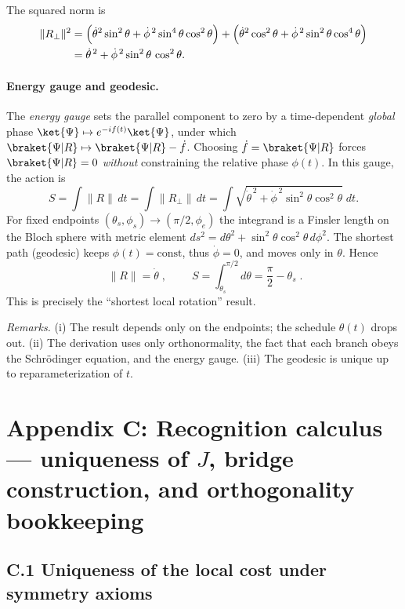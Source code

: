 \documentclass[11pt,letterpaper]{article}
\theoremstyle{definition}
\begin{document}
The squared norm is
\begin{align}
\|R_\perp\|^2
&=\Bigl(\dot\theta^2\sin^2\theta+\dot\phi^{\,2}\sin^4\theta\cos^2\theta\Bigr)
 + \Bigl(\dot\theta^2\cos^2\theta+\dot\phi^{\,2}\sin^2\theta\cos^4\theta\Bigr)\nonumber\\
&=\dot\theta^{\,2}+\dot\phi^{\,2}\sin^2\theta\,\cos^2\theta.
\label{eq:A-Rperp-norm}
\end{align}

\paragraph{Energy gauge and geodesic.}
The \emph{energy gauge} sets the parallel component to zero by a time-dependent \emph{global} phase $\ket{\Psi}\mapsto e^{-if(t)}\ket{\Psi}$, under which $\braket{\Psi|R}\mapsto \braket{\Psi|R}-\dot f$. Choosing $\dot f=\braket{\Psi|R}$ forces $\braket{\Psi|R}=0$ \emph{without} constraining the relative phase $\phi(t)$. In this gauge, the action is
\begin{equation}
S=\int\!\|R\|\,dt=\int\!\|R_\perp\|\,dt=\int\!\sqrt{\dot\theta^{\,2}+\dot\phi^{\,2}\sin^2\theta\cos^2\theta}\;dt.
\label{eq:A-S-energy-gauge}
\end{equation}
For fixed endpoints $(\theta_s,\phi_s)\to(\pi/2,\phi_e)$ the integrand is a Finsler length on the Bloch sphere with metric element $ds^2=d\theta^2+\sin^2\theta\cos^2\theta\,d\phi^2$. The shortest path (geodesic) keeps $\phi(t)=\mathrm{const}$, thus $\dot\phi=0$, and moves only in $\theta$. Hence
\begin{equation}
\boxed{\;\|R\|=\dot\theta\;},\qquad
\boxed{\;S=\int_{\theta_s}^{\pi/2}\!d\theta=\frac{\pi}{2}-\theta_s\;}.
\label{eq:A-main}
\end{equation}
This is precisely the “shortest local rotation” result. %

\noindent
\emph{Remarks.} (i) The result depends only on the endpoints; the schedule $\theta(t)$ drops out. (ii) The derivation uses only orthonormality, the fact that each branch obeys the Schrödinger equation, and the energy gauge. (iii) The geodesic is unique up to reparameterization of $t$. %
\section*{Appendix C: Recognition calculus — uniqueness of \texorpdfstring{$J$}{J}, bridge construction, and orthogonality bookkeeping}

\subsection*{C.1 Uniqueness of the local cost under symmetry axioms}
\end{document}

